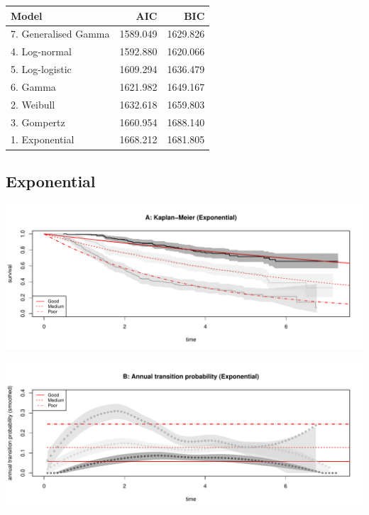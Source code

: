 \documentclass[]{article}
\begin{document}
\begin{table}[H]
\centering
\begin{tabular}{lrr}
\toprule
Model & AIC & BIC\\
\midrule
\rowcolor{gray!6}  7. Generalised Gamma & 1589.049 & 1629.826\\
4. Log-normal & 1592.880 & 1620.066\\
\rowcolor{gray!6}  5. Log-logistic & 1609.294 & 1636.479\\
6. Gamma & 1621.982 & 1649.167\\
\rowcolor{gray!6}  2. Weibull & 1632.618 & 1659.803\\
3. Gompertz & 1660.954 & 1688.140\\
\rowcolor{gray!6}  1. Exponential & 1668.212 & 1681.805\\
\bottomrule
\end{tabular}
\end{table}

\subsection{Exponential}\label{exponential}

\begin{flushleft}\includegraphics[height=0.3\textheight]{images/expo-1} \end{flushleft}

\begin{flushleft}\includegraphics[height=0.3\textheight]{images/expo-2} \end{flushleft}
\end{document}
